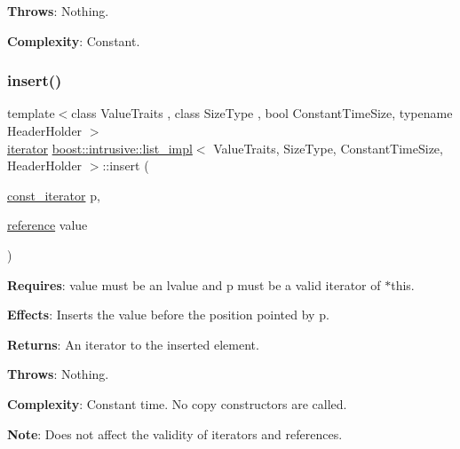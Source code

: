 {\bfseries Throws}\+: Nothing.

{\bfseries Complexity}\+: Constant. \mbox{\label{classboost_1_1intrusive_1_1list__impl_a51f571f4048e3f3e7bcb944d6f82bca0}} 
\subsubsection{\texorpdfstring{insert()}{insert()}\hspace{0.1cm}{\footnotesize\ttfamily [1/2]}}
{\footnotesize\ttfamily template$<$class Value\+Traits , class Size\+Type , bool Constant\+Time\+Size, typename Header\+Holder $>$ \\
\hyperlink{classboost_1_1intrusive_1_1list__impl_a15c0189bf62eb9fb98bc07ef10b8cb23}{iterator} \hyperlink{classboost_1_1intrusive_1_1list__impl}{boost\+::intrusive\+::list\+\_\+impl}$<$ Value\+Traits, Size\+Type, Constant\+Time\+Size, Header\+Holder $>$\+::insert (\begin{DoxyParamCaption}\item[{\hyperlink{classboost_1_1intrusive_1_1list__impl_af4ced710fe02662c5650d161af83d8cd}{const\+\_\+iterator}}]{p,  }\item[{\hyperlink{classboost_1_1intrusive_1_1list__impl_a881763b587dbe7c0237a552a9e89755a}{reference}}]{value }\end{DoxyParamCaption})\hspace{0.3cm}{\ttfamily [inline]}}

{\bfseries Requires}\+: value must be an lvalue and p must be a valid iterator of $\ast$this.

{\bfseries Effects}\+: Inserts the value before the position pointed by p.

{\bfseries Returns}\+: An iterator to the inserted element.

{\bfseries Throws}\+: Nothing.

{\bfseries Complexity}\+: Constant time. No copy constructors are called.

{\bfseries Note}\+: Does not affect the validity of iterators and references. \mbox{\label{classboost_1_1intrusive_1_1list__impl_afabe1de903e672ab93e55782fb5f0006}} 

